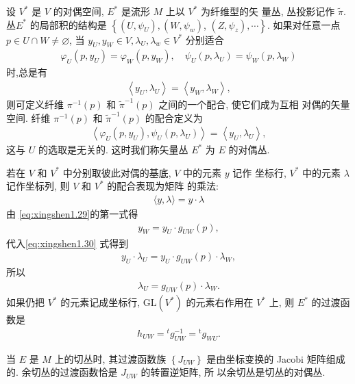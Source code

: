     \begin{solution}
        设 $V^*$ 是 $V$ 的对偶空间, $E^*$ 是流形 $M$ 上以 $V^*$ 为纤维型的矢 量丛, 丛投影记作 $\tilde{\pi}$. 丛$E^*$ 的局部积的结构是 $\left\{\left(U, \psi_U\right),\left(W, \psi_w\right)\right.$, $\left.\left(Z, \psi_z\right), \cdots\right\}$. 如果对任意一点 $p \in U \cap W \neq \varnothing$, 当 $y_U, y_W \in V, \lambda_U, \lambda_w\in V^* $  分别适合
    \begin{align}\label{eq:xingshen1.29}
    \varphi_U\left(p, y_U\right)=\varphi_W\left(p, y_W\right), \quad \psi_U\left(p, \lambda_U\right)=\psi_W\left(p, \lambda_W\right)
    \end{align}
    时,总是有
    \begin{align}\label{eq:xingshen1.30}
    \left\langle y_U, \lambda_U\right\rangle=\left\langle y_W, \lambda_W\right\rangle,
    \end{align}
    则可定义纤维 $\pi^{-1}(p)$ 和 $\tilde{\pi}^{-1}(p)$ 之间的一个配合, 使它们成为互相 对偶的矢量空间. 纤维 $\pi^{-1}(p)$ 和 $\tilde{\pi}^{-1}(p)$ 的配合定义为
    \begin{align*}
    \left\langle\varphi_U\left(p, y_U\right), \psi_U\left(p, \lambda_U\right)\right\rangle=\left\langle y_U, \lambda_U\right\rangle,
    \end{align*}
    这与 $U$ 的选取是无关的. 这时我们称矢量丛 $E^*$ 为 $E$ 的对偶丛.

    若在 $V$ 和 $V^*$ 中分别取彼此对偶的基底, $V$ 中的元素 $y$ 记作 坐标行, $V^*$ 中的元素 $\lambda$ 记作坐标列, 则 $V$ 和 $V^{*}$ 的配合表现为矩阵 的乘法:
    \begin{align*}
    \langle y, \lambda\rangle=y \cdot \lambda
    \end{align*}
    由 \eqref{eq:xingshen1.29}的第一式得
    \begin{align*}
    y_W=y_U \cdot g_{U W}(p),
    \end{align*}
    代入\eqref{eq:xingshen1.30} 式得到
    \begin{align*}
        y_U \cdot \lambda_U=y_U \cdot g_{U W}(p) \cdot \lambda_W,
        \end{align*}
        所以
        \begin{align*}
        \lambda_U=g_{U W}(p) \cdot \lambda_W .
        \end{align*}
        如果仍把 $V^*$ 的元素记成坐标行, $\mathrm{GL}\left(V^*\right)$ 的元素右作用在 $V^*$ 上, 则 $E^*$ 的过渡函数是
        \begin{align*}
        h_{U W}={ }^t g_{U W}^{-1}={ }^{\mathrm{t}} g_{W U} .
        \end{align*}

        当 $E$ 是 $M$ 上的切丛时, 其过渡函数族 $\left\{J_{U W}\right\}$ 是由坐标变换的 Jacobi 矩阵组成的. 余切丛的过渡函数恰是 $J_{U W}$ 的转置逆矩阵, 所 以余切丛是切丛的对偶丛.
    \end{solution}

